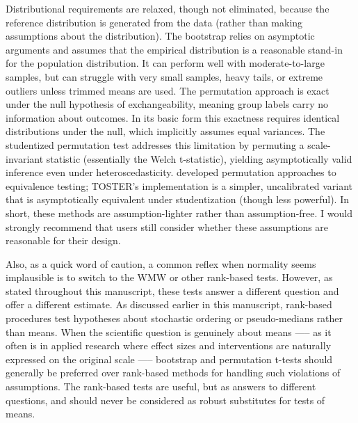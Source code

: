\documentclass[]{interact}
\theoremstyle{plain}%
\theoremstyle{definition}
\theoremstyle{remark}
\begin{document}
Distributional requirements are relaxed, though not eliminated, because
the reference distribution is generated from the data (rather than
making assumptions about the distribution). The bootstrap relies on
asymptotic arguments and assumes that the empirical distribution is a
reasonable stand-in for the population distribution. It can perform well
with moderate-to-large samples, but can struggle with very small
samples, heavy tails, or extreme outliers unless trimmed means are used.
The permutation approach is exact under the null hypothesis of
exchangeability, meaning group labels carry no information about
outcomes. In its basic form this exactness requires identical
distributions under the null, which implicitly assumes equal variances.
The studentized permutation test \citep{janssen1997, chung2013}
addresses this limitation by permuting a scale-invariant statistic
(essentially the Welch t-statistic), yielding asymptotically valid
inference even under heteroscedasticity.
\citet{Arboretti_Pesarin_Salmaso_2020} developed permutation approaches
to equivalence testing; TOSTER's implementation is a simpler,
uncalibrated variant that is asymptotically equivalent under
studentization (though less powerful). In short, these methods are
assumption-lighter rather than assumption-free. I would strongly
recommend that users still consider whether these assumptions are
reasonable for their design.

Also, as a quick word of caution, a common reflex when normality seems
implausible is to switch to the WMW or other rank-based tests. However,
as stated throughout this manuscript, these tests answer a different
question and offer a different estimate. As discussed earlier in this
manuscript, rank-based procedures test hypotheses about stochastic
ordering or pseudo-medians rather than means. When the scientific
question is genuinely about means ----- as it often is in applied
research where effect sizes and interventions are naturally expressed on
the original scale ----- bootstrap and permutation t-tests should
generally be preferred over rank-based methods for handling such
violations of assumptions. The rank-based tests are useful, but as
answers to different questions, and should never be considered as robust
substitutes for tests of means.
\end{document}
